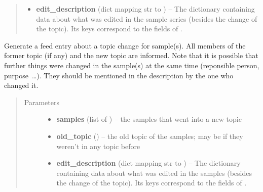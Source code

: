 \documentclass[a4paper,11pt,english]{sphinxmanual}
\begin{document}
\begin{fulllineitems}
\begin{fulllineitems}
\begin{quote}
\begin{description}
\begin{itemize}
\item {} 
\textbf{edit\_description} (dict mapping str to ) -- The dictionary containing data about what was
edited in the sample series (besides the change of the topic).
Its keys correspond to the fields of
{\hyperref[programming/utilities:samples.utils.views.EditDescriptionForm]{}}.

\end{itemize}

\end{description}\end{quote}

\end{fulllineitems}


\begin{fulllineitems}
\label{programming/utilities:samples.utils.views.Reporter.report_changed_sample_topic}
Generate a feed entry about a topic change for sample(s).  All
members of the former topic (if any) and the new topic are informed.
Note that it is possible that further things were changed in the
sample(s) at the same time (reponsible person, purpose …).  They should
be mentioned in the description by the one who changed it.
\begin{quote}\begin{description}
\item[{Parameters}] \leavevmode\begin{itemize}
\item {} 
\textbf{samples} (list of ) -- the samples that went into a new topic

\item {} 
\textbf{old\_topic} () -- the old topic of the samples; may be  if
they weren't in any topic before

\item {} 
\textbf{edit\_description} (dict mapping str to ) -- The dictionary containing data about what was
edited in the samples (besides the change of the topic).  Its keys
correspond to the fields of
{\hyperref[programming/utilities:samples.utils.views.EditDescriptionForm]{}}.

\end{itemize}


\end{description}
\end{quote}
\end{fulllineitems}
\end{fulllineitems}
\end{document}
